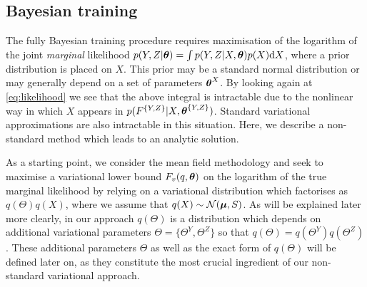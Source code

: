 \subsection{Bayesian training}
\par 
The fully Bayesian training procedure requires maximisation of
the logarithm of the joint \emph{marginal} likelihood $p(Y,Z |
\boldsymbol \theta) = \int p(Y,Z | X, \boldsymbol \theta) p(X) \text{d} X$, where a prior
distribution is placed on $X$. This prior may be a standard normal distribution or may generally depend on a set
of parameters $\boldsymbol \theta^X$. By
looking again at \eqref{eq:likelihood} we see that the above integral is
intractable due to the nonlinear way in which $X$ appears in
$p(F^{\{Y,Z\}}|X,\boldsymbol \theta^{\{Y,Z\}})$. Standard variational approximations
are also intractable in this situation. Here, we describe a non-standard
method which leads to an analytic solution.

As a starting point, we consider the mean field methodology and seek to maximise
a variational lower bound $F_v(q,\boldsymbol \theta)$ on the logarithm of the
true marginal likelihood by relying on a variational distribution which factorises as
$q(\Theta)q(X)$, where we assume that $q(X)
\sim \mathcal{N}(\boldsymbol \mu, S)$. 
As will be explained later more clearly, in our approach $q(\Theta)$ is a distribution which depends on additional
variational parameters $\Theta=\{\Theta^Y, \Theta^Z\}$ so that $q(\Theta) = q(\Theta^Y) q(\Theta^Z)$.
These additional parameters $\Theta$ as well as the exact form of $q(\Theta)$
will be defined later on, as they constitute the most crucial ingredient of our non-standard variational approach.

